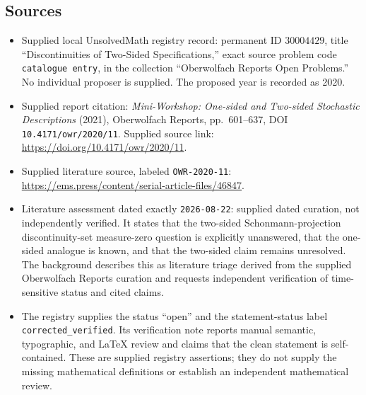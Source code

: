 \documentclass[11pt]{article}
\begin{document}
\subsection{Sources}
\begin{itemize}
\item Supplied local UnsolvedMath registry record: permanent ID \(30004429\), title ``Discontinuities of Two-Sided Specifications,'' exact source problem code \texttt{catalogue entry}, in the collection ``Oberwolfach Reports Open Problems.'' No individual proposer is supplied. The proposed year is recorded as 2020.
\item Supplied report citation: \emph{Mini-Workshop: One-sided and Two-sided Stochastic Descriptions} (2021), Oberwolfach Reports, pp.\ 601--637, DOI \texttt{10.4171/owr/2020/11}. Supplied source link: \url{https://doi.org/10.4171/owr/2020/11}.
\item Supplied literature source, labeled \texttt{OWR-2020-11}: \url{https://ems.press/content/serial-article-files/46847}.
\item Literature assessment dated exactly \texttt{2026-08-22}: supplied dated curation, not independently verified. It states that the two-sided Schonmann-projection discontinuity-set measure-zero question is explicitly unanswered, that the one-sided analogue is known, and that the two-sided claim remains unresolved. The background describes this as literature triage derived from the supplied Oberwolfach Reports curation and requests independent verification of time-sensitive status and cited claims.
\item The registry supplies the status ``open'' and the statement-status label \texttt{corrected\_verified}. Its verification note reports manual semantic, typographic, and LaTeX review and claims that the clean statement is self-contained. These are supplied registry assertions; they do not supply the missing mathematical definitions or establish an independent mathematical review.
\end{itemize}
\end{document}
